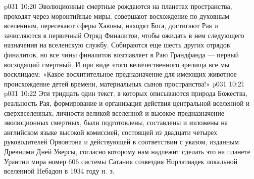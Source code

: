 \vs p031 10:20 \pc Эволюционные смертные рождаются на планетах пространства, проходят через моронтийные миры, совершают восхождение по духовным вселенным, пересекают сферы Хавоны, находят Бога, достигают Рая и зачисляются в первичный Отряд Финалитов, чтобы ожидать в нем следующего назначения на вселенскую службу. Собираются еще шесть других отрядов финалитов, но все чины финалитов возглавляет в Раю Грандфанда --- первый восходящий смертный. И при виде этого величественного зрелища все мы восклицаем: «Какое восхитительное предназначение для имеющих животное происхождение детей времени, материальных сынов пространства!»
\vs p031 10:21 
\separatorline
\vsetoff
\vs p031 10:22 Эти тридцать один текст, в которых описываются природа Божества, реальность Рая, формирование и организация действия центральной вселенной и сверхвселенных, личности великой вселенной и высокое предназначение эволюционных смертных, были подготовлены, составлены и изложены на английском языке высокой комиссией, состоящей из двадцати четырех руководителей Орвонтона и действующей в соответствии с указом, изданным Древними Дней Уверсы, согласно которому нам надлежит сделать это на планете Урантии мира номер 606 системы Сатания созвездия Норлатиадек локальной вселенной Небадон в 1934 году н. э.
